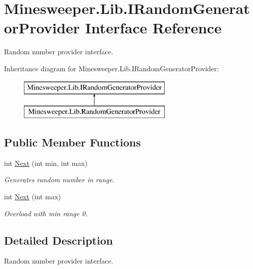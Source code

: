 \hypertarget{interface_minesweeper_1_1_lib_1_1_i_random_generator_provider}{\section{Minesweeper.\+Lib.\+I\+Random\+Generator\+Provider Interface Reference}
\label{interface_minesweeper_1_1_lib_1_1_i_random_generator_provider}
}


Random number provider interface.  


Inheritance diagram for Minesweeper.\+Lib.\+I\+Random\+Generator\+Provider\+:\begin{figure}[H]
\begin{center}
\leavevmode
\includegraphics[height=2.000000cm]{interface_minesweeper_1_1_lib_1_1_i_random_generator_provider}
\end{center}
\end{figure}
\subsection*{Public Member Functions}
\begin{DoxyCompactItemize}
\item 
int \hyperlink{interface_minesweeper_1_1_lib_1_1_i_random_generator_provider_a0f49fa42c327f257a83bfb9264cb9124}{Next} (int min, int max)
\begin{DoxyCompactList}\small\item\em Generates random number in range. \end{DoxyCompactList}\item 
int \hyperlink{interface_minesweeper_1_1_lib_1_1_i_random_generator_provider_a582bbebd6de2ecdded37c76b35c74a66}{Next} (int max)
\begin{DoxyCompactList}\small\item\em Overload with min range 0. \end{DoxyCompactList}\end{DoxyCompactItemize}


\subsection{Detailed Description}
Random number provider interface. 



